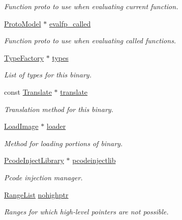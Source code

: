 \begin{DoxyCompactItemize}
\begin{DoxyCompactList}\small\item\em Function proto to use when evaluating current function. \end{DoxyCompactList}\item 
\mbox{\hyperlink{class_proto_model}{Proto\+Model}} $\ast$ \mbox{\hyperlink{class_architecture_a44c624320bcc9d52dcecdf553f3b4796}{evalfp\+\_\+called}}
\begin{DoxyCompactList}\small\item\em Function proto to use when evaluating called functions. \end{DoxyCompactList}\item 
\mbox{\hyperlink{class_type_factory}{Type\+Factory}} $\ast$ \mbox{\hyperlink{class_architecture_a8225ba7bd6ac802660e03ee793289dd1}{types}}
\begin{DoxyCompactList}\small\item\em List of types for this binary. \end{DoxyCompactList}\item 
const \mbox{\hyperlink{class_translate}{Translate}} $\ast$ \mbox{\hyperlink{class_architecture_a81f2db17fdc609a7d1cedbc0a2eb7753}{translate}}
\begin{DoxyCompactList}\small\item\em Translation method for this binary. \end{DoxyCompactList}\item 
\mbox{\hyperlink{class_load_image}{Load\+Image}} $\ast$ \mbox{\hyperlink{class_architecture_a344b1348ed8f0bbe0d050e7038bb290d}{loader}}
\begin{DoxyCompactList}\small\item\em Method for loading portions of binary. \end{DoxyCompactList}\item 
\mbox{\hyperlink{class_pcode_inject_library}{Pcode\+Inject\+Library}} $\ast$ \mbox{\hyperlink{class_architecture_a7d04d77ca75b9e75caa3750c156d9bbf}{pcodeinjectlib}}
\begin{DoxyCompactList}\small\item\em Pcode injection manager. \end{DoxyCompactList}\item 
\mbox{\hyperlink{class_range_list}{Range\+List}} \mbox{\hyperlink{class_architecture_a693da460aeb788e4fbaf3361bd07756a}{nohighptr}}
\begin{DoxyCompactList}\small\item\em Ranges for which high-\/level pointers are not possible. \end{DoxyCompactList}\item 

\end{DoxyCompactItemize}
